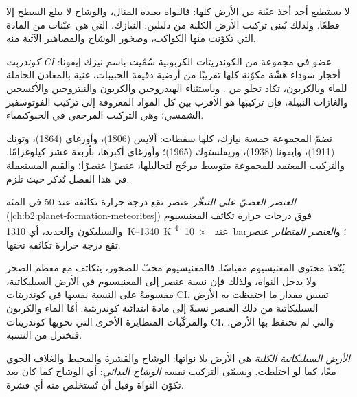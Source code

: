 لا يستطيع أحد أخذ عيّنة من الأرض كلها: فالنواة بعيدة المنال، والوشاح
لا يبلغ السطح إلا قطعًا. ولذلك يُبنى تركيب الأرض الكلية
من دليلين: النيازك، التي هي عيّنات من المادة
التي تكوّنت منها الكواكب، وصخور الوشاح والمصاهير
الآتية منه.

\begin{definition}[كوندريت CI]\label{def:b2:elements-in-the-earth:ci}
\emph{كوندريت CI} عضو في مجموعة من
الكوندريتات الكربونية سُمّيت باسم نيزك إيفونا: أحجار سوداء هشّة
مكوّنة كلها تقريبًا من أرضية دقيقة الحبيبات، غنية بالمعادن الحاملة للماء وبالكربون،
تكاد تخلو من . وباستثناء الهيدروجين والكربون والنيتروجين والأكسجين
والغازات النبيلة، فإن تركيبها هو الأقرب بين كل المواد المعروفة إلى تركيب
الفوتوسفير الشمسي؛ وهي التركيب المرجعي في الجيوكيمياء.
\end{definition}

تضمّ المجموعة خمسة نيازك، كلها سقطات: ألايس (1806)، وأورغاي
(1864)، وتونك (1911)، وإيفونا (1938)، وريفلستوك (1965)؛ وأورغاي أكبرها،
بأربعة عشر كيلوغرامًا. والتركيب المعتمد للمجموعة متوسط مرجّح
لتحاليلها، عنصرًا عنصرًا؛ والقيم المستعملة في هذا الفصل
تُذكر حيث تلزم.

\begin{definition}
\label{def:b2:elements-in-the-earth:volatility}
\emph{العنصر العصيّ على التبخّر} عنصر تقع درجة حرارة
تكاثفه عند 50 في المئة (\cref{ch:b2:planet-formation-meteorites}) فوق
درجات حرارة تكاثف المغنيسيوم والسيليكون والحديد، أي \qtyrange{1310}{1340}{K} عند
\qty{e-4}{bar}؛
و\emph{العنصر المتطاير} عنصر تقع درجة حرارة
تكاثفه تحتها.
\end{definition}

يُتّخذ محتوى المغنيسيوم مقياسًا. فالمغنيسيوم محبّ للصخور، يتكاثف
مع معظم الصخر ولا يدخل النواة، ولذلك فإن نسبة عنصر
إلى المغنيسيوم في الأرض السيليكاتية، مقسومةً على النسبة نفسها في كوندريتات CI،
تقيس مقدار ما احتفظت به الأرض السيليكاتية من ذلك العنصر نسبةً إلى
مادة ابتدائية كوندريتية. أمّا الماء والكربون والمركّبات المتطايرة الأخرى التي
تحويها كوندريتات CI، والتي لم تحتفظ بها الأرض، فتختزل من النسبة.

\begin{definition}
\label{def:b2:elements-in-the-earth:bse}
\emph{الأرض السيليكاتية الكلية} هي الأرض بلا
نواتها: الوشاح والقشرة والمحيط والغلاف الجوي معًا، كما لو
اختلطت. ويسمّى التركيب نفسه \emph{الوشاح البدائي}:
أي الوشاح كما كان بعد تكوّن النواة وقبل أن تُستخلص منه أي
قشرة.
\end{definition}

